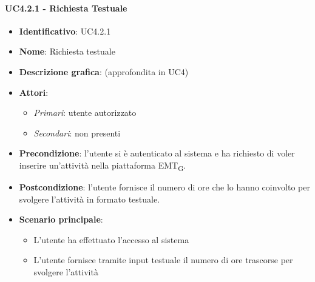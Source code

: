 \paragraph{UC4.2.1 - Richiesta Testuale}
\begin{itemize}
   \item \textbf{Identificativo}: UC4.2.1
   \item \textbf{Nome}: Richiesta testuale
   \item \textbf{Descrizione grafica}: (approfondita in UC4)
   \item \textbf{Attori}:
   \begin{itemize} 
       \item \textit{Primari}: utente autorizzato
       \item \textit{Secondari}: non presenti
   \end{itemize}
       \item \textbf{Precondizione}: l'utente si è autenticato al sistema e ha richiesto di voler inserire un'attività nella piattaforma EMT\textsubscript{G}. 
       \item \textbf{Postcondizione}: l'utente fornisce il numero di ore che lo hanno coinvolto per svolgere l'attività in formato testuale. 
    \item \textbf{Scenario principale}: 
       \begin{itemize}
           \item L'utente ha effettuato l'accesso al sistema 
           \item L'utente fornisce tramite input testuale il numero di ore trascorse per svolgere l'attività
       \end{itemize}
\end{itemize}

